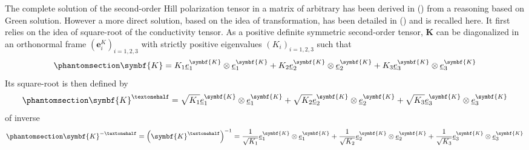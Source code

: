 \documentclass[
  a4paper,
  numbers=noendperiod,
  DIV=12]{scrreprt}
\newcommand{\uu}[1]{{\symbf{{#1}}}}
\newcommand{\uv}[1]{{\underline{{#1}}}}
\begin{document}
The complete solution of the second-order Hill polarization tensor in a
matrix of arbitrary has been derived in
() from a
reasoning based on Green solution. However a more direct solution, based
on the idea of transformation, has been detailed in
() and is recalled
here. It first relies on the idea of square-root of the conductivity
tensor. As a positive definite symmetric second-order tensor, \(\uu{K}\)
can be diagonalized in an orthonormal frame
\(\left(\uu{e}^K_i\right)_{i=1,2,3}\) with strictly positive eigenvalues
\(\left(K_i\right)_{i=1,2,3}\) such that
\begin{equation}\protect\phantomsection\label{eq-decK}{
\uu{K}=K_1 \uv{e}^{\uu{K}}_1\otimes\uv{e}^{\uu{K}}_1 + K_2 \uv{e}^{\uu{K}}_2\otimes\uv{e}^{\uu{K}}_2 + K_3 \uv{e}^{\uu{K}}_3\otimes\uv{e}^{\uu{K}}_3
}\end{equation} Its square-root is then defined by
\begin{equation}\protect\phantomsection\label{eq-sqrtK}{
\uu{K}^{½}=\sqrt{K_1} \uv{e}^{\uu{K}}_1\otimes\uv{e}^{\uu{K}}_1 + \sqrt{K_2} \uv{e}^{\uu{K}}_2\otimes\uv{e}^{\uu{K}}_2 + \sqrt{K_3} \uv{e}^{\uu{K}}_3\otimes\uv{e}^{\uu{K}}_3
}\end{equation} of inverse
\begin{equation}\protect\phantomsection\label{eq-invsqrtK}{
\uu{K}^{-½}=\left(\uu{K}^{½}\right)^{-1}=\frac{1}{\sqrt{K_1}} \uv{e}^{\uu{K}}_1\otimes\uv{e}^{\uu{K}}_1 + \frac{1}{\sqrt{K_2}} \uv{e}^{\uu{K}}_2\otimes\uv{e}^{\uu{K}}_2 + \frac{1}{\sqrt{K_3}} \uv{e}^{\uu{K}}_3\otimes\uv{e}^{\uu{K}}_3
}\end{equation}
\end{document}
